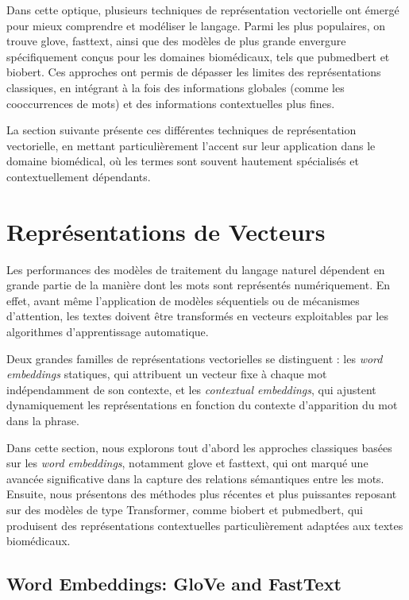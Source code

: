 \documentclass[12pt]{report}
\begin{document}
Dans cette optique, plusieurs techniques de représentation vectorielle ont émergé pour mieux comprendre et modéliser le langage. Parmi les plus populaires, on trouve \gls{glove}, \gls{fasttext}, ainsi que des modèles de plus grande envergure spécifiquement conçus pour les domaines biomédicaux, tels que \gls{pubmedbert} et \gls{biobert}. Ces approches ont permis de dépasser les limites des représentations classiques, en intégrant à la fois des informations globales (comme les cooccurrences de mots) et des informations contextuelles plus fines.

La section suivante présente ces différentes techniques de représentation vectorielle, en mettant particulièrement l'accent sur leur application dans le domaine biomédical, où les termes sont souvent hautement spécialisés et contextuellement dépendants.

\vspace{0.5cm}
\section{Représentations de Vecteurs }

Les performances des modèles de traitement du langage naturel dépendent en grande partie de la manière dont les mots sont représentés numériquement. En effet, avant même l'application de modèles séquentiels ou de mécanismes d’attention, les textes doivent être transformés en vecteurs exploitables par les algorithmes d'apprentissage automatique.

Deux grandes familles de représentations vectorielles se distinguent : les \textit{word embeddings} statiques, qui attribuent un vecteur fixe à chaque mot indépendamment de son contexte, et les \textit{contextual embeddings}, qui ajustent dynamiquement les représentations en fonction du contexte d’apparition du mot dans la phrase.

Dans cette section, nous explorons tout d’abord les approches classiques basées sur les \textit{word embeddings}, notamment \gls{glove} et \gls{fasttext}, qui ont marqué une avancée significative dans la capture des relations sémantiques entre les mots. Ensuite, nous présentons des méthodes plus récentes et plus puissantes reposant sur des modèles de type Transformer, comme \gls{biobert} et \gls{pubmedbert}, qui produisent des représentations contextuelles particulièrement adaptées aux textes biomédicaux.

\subsection{Word Embeddings: GloVe and FastText}
\end{document}
